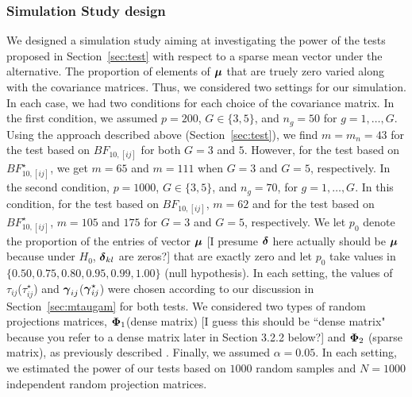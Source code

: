 \documentclass[times,sort&compress,3p]{elsarticle}
\theoremstyle{plain}%
\theoremstyle{definition}
\newcommand{\ugamma}            {\mbox{\boldmath$\gamma$}}
\newcommand{\udelta}            {\mbox{\boldmath$\delta$}}
\newcommand{\umu}               {\mbox{\boldmath$\mu$}}
\newcommand{\uPhi}              {\mbox{\boldmath$\Phi$}}
\begin{document}
\subsubsection{Simulation Study design} \label{sec:simdesign}
We designed a simulation study aiming at investigating the power of the tests proposed in Section~\ref{sec:test} with respect to a sparse mean vector under the alternative. The proportion of elements of $\umu$ that are truely zero varied along with the covariance matrices.
Thus, we considered two settings for our simulation. In each case, we had two conditions for each choice of the covariance matrix. 
In the first condition, we assumed $p = 200$, $G \in \{3, 5\}$, and $n_g = 50$ for $ g =  1, \ldots, G$. Using the approach described above (Section~\ref{sec:test}), we find $m = m_n = 43$ for the test based on $BF_{10,[ij]}$ for both $G=3$ and $5$. However, for the test based on $BF^{\star}_{10, [ij]}$, we get $m = 65$ and $m = 111$ when $G=3$ and $G=5$, respectively. In the second condition, $p = 1000$, $G \in \{3,5\}$, and $n_g = 70$, for $g = 1,\ldots,G$. In this condition, for the test based on $BF_{10,[ij]}$, $m = 62$ and for the test based on $BF^{\star}_{10,[ij]}$, $m = 105$ and $175$ for $G=3$ and $G=5$, respectively. We let $p_0$ denote the proportion of the entries of vector $\umu$ {\color{blue}[I presume $\udelta$ here actually should be $\umu$ because under $H_0$, $\udelta_{kl}$ are zeros?]} that are exactly zero and let $p_0$ take values in $\{ 0.50, 0.75, 0.80, 0.95, 0.99,1.00\}$ (null hypothesis). In each setting, the values of $\tau_{ij}$($\tau^{\star}_{ij}$) and $\ugamma_{ij}$($\ugamma^{\star}_{ij}$) were chosen according to our discussion in Section~\ref{sec:mtaugam} for both tests. We considered two types of random projections matrices, $\uPhi_{1}$(dense matrix) {\color{blue}[I guess this should be ``dense matrix" because you refer to a dense matrix later in Section 3.2.2 below?]} and $\uPhi_2$ (sparse matrix), as previously described \cite{srivastava2014raptt,zoh2018powerful}. Finally, we assumed $\alpha = 0.05$. In each setting, we estimated the power of our tests based on $1000$ random samples and $N = 1000$ independent random projection matrices.
\end{document}
